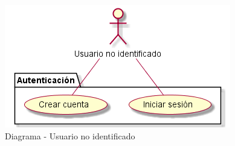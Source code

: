 \begin{figure}[H]
	\centering
	\includegraphics{5-AnalisisDelSistemaDeInformacion//Casos de uso//usuarioNoIdentificado//diagrama.png}
	\caption{Diagrama - Usuario no identificado}
\end{figure}